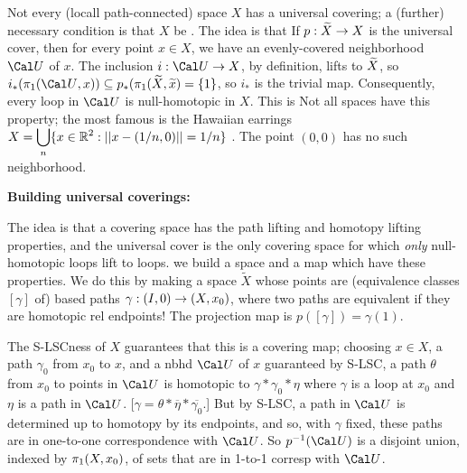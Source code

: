 \msk

Not every (locall path-connected) space $X$ has a universal covering; a 
(further) necessary condition is that $X$ be .
The idea is that If $p:\widetilde{X}\rightarrow X$ is the universal cover, then for every 
point $x\in X$, we have an evenly-covered neighborhood ${\Cal U}$ of $x$.
The inclusion $i:{\Cal U}\ra X$, by definition, lifts to $\widetilde{X}$, so
$i_*(\pu({\Cal U},x))\sset p_*(\pu(\wtl{X},\wtl{x}) = \{1\}$, so
$i_*$ is the trivial map. Consequently, every loop in ${\Cal U}$ is 
null-homotopic in $X$. This is  Not all spaces have this property; the most famous is the 
Hawaiian earrings 
$\displaystyle X=\bigcup_{n}\{x\in {\Bbb R}^2 :  ||x-(1/n,0)||=1/n\}$ .
The point $(0,0)$ has no such neighborhood. 

\vfill
\eject


{\bf Building universal coverings:} 

\ssk

The idea is that a covering
space has the path lifting and homotopy
lifting properties, and the universal 
cover is the only covering space for 
which {\it only} null-homotopic loops lift to loops.  we build a 
space and a map which  have these properties.
We do this by making a space $\widetilde{X}$ whose
points are (equivalence classes $[\gamma]$ of)
based paths $\gamma:(I,0)\rightarrow (X,x_0)$, where two paths are equivalent
if they are homotopic rel endpoints! The projection map is
$p([\gamma])=\gamma(1)$. 

\ssk

The S-LSCness of $X$ guarantees that this is a 
covering map; choosing $x\in X$, a path $\gamma_0$ from $x_0$ to $x$,
and a nbhd ${\Cal U}$ of $x$ guaranteed by S-LSC, a path $\theta$ from 
$x_0$ to points in ${\Cal U}$ is homotopic to $\gamma*\gamma_0*\eta$
where $\gamma$ is a loop at $x_0$ and $\eta$ is a path in ${\Cal U}$.
[$\gamma=\theta*\overline{\eta}*\overline{\gamma_0}$.]
But by S-LSC, a path in ${\Cal U}$ is determined up to homotopy
by its endpoints, and so, with $\gamma$ fixed, these paths are in one-to-one
correspondence with ${\Cal U}$. So $p\inv({\Cal U})$ is a disjoint union,
indexed by $\pi_1(X,x_0)$, of sets that are in 1-to-1 corresp with ${\Cal U}$.

